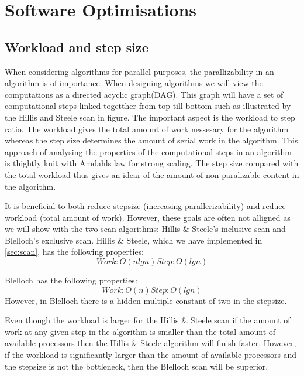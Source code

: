 \section{Software Optimisations}
\label{sec:software optimisations}

\subsection{Workload and step size}
\label{sec:workload and step size}
When considering algorithms for parallel purposes, the parallizability in an algorithm is of importance.
When designing algorithms we will view the computations as a directed acyclic graph(DAG).
This graph will have a set of computational steps linked togetther from top till bottom such as illustrated by the Hillis and Steele scan in figure. 
The important aspect is the workload to step ratio.
The workload gives the total amount of work nessesary for the algorithm whereas the step size determines the amount of serial work in the algorithm.
This approach of analysing the properties of the computational steps in an algorithm is thightly knit with Amdahls law for strong scaling.
The step size compared with the total workload thus gives an idear of the amount of non-paralizable content in the algorithm.

It is beneficial to both reduce stepsize (increasing parallerizability) and reduce workload (total amount of work).
However, these goals are often not alligned as we will show with the two scan algorithms: Hillis \& Steele's inclusive scan and Blelloch's exclusive scan.
Hillis \& Steele, which we have implemented in \cref{sec:scan}, has the following properties:
\begin{equation*}
Work: O(n lg n)
Step: O(lg n)
\end{equation*}

Blelloch has the following properties:
\begin{equation*}
Work: O(n)
Step: O(lg n)
\end{equation*}
However, in Blelloch there is a hidden multiple constant of two in the stepsize.

Even though the workload is larger for the Hillis \& Steele scan if the amount of work at any given step in the algorithm is smaller than the total amount of available processors then the Hillis \& Steele algorithm will finish faster.
However, if the workload is significantly larger than the amount of available processors and the stepsize is not the bottleneck, then the Blelloch scan will be superior.

